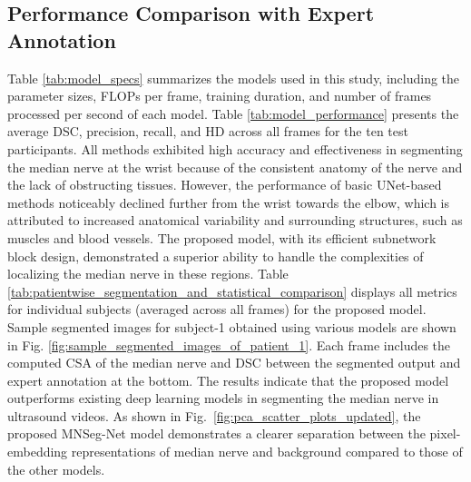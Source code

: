 \subsection{Performance Comparison with Expert Annotation}
Table \ref{tab:model_specs} summarizes the models used in this study, including the parameter sizes, FLOPs per frame, training duration, and number of frames processed per second of each model. Table \ref{tab:model_performance} presents the average DSC, precision, recall, and HD across all frames for the ten test participants. All methods exhibited high accuracy and effectiveness in segmenting the median nerve at the wrist because of the consistent anatomy of the nerve and the lack of obstructing tissues. However, the performance of basic UNet-based methods noticeably declined further from the wrist towards the elbow, which is attributed to increased anatomical variability and surrounding structures, such as muscles and blood vessels. The proposed model, with its efficient subnetwork block design, demonstrated a superior ability to handle the complexities of localizing the median nerve in these regions. Table \ref{tab:patientwise_segmentation_and_statistical_comparison} displays all metrics for individual subjects (averaged across all frames) for the proposed model. Sample segmented images for subject-1 obtained using various models are shown in Fig. \ref{fig:sample_segmented_images_of_patient_1}. Each frame includes the computed CSA of the median nerve and DSC between the segmented output and expert annotation at the bottom. The results indicate that the proposed model outperforms existing deep learning models in segmenting the median nerve in ultrasound videos. As shown in Fig.~\ref{fig:pca_scatter_plots_updated}, the proposed MNSeg-Net model 
demonstrates a clearer separation between the pixel-embedding representations of 
median nerve and background compared to those of the other models.


